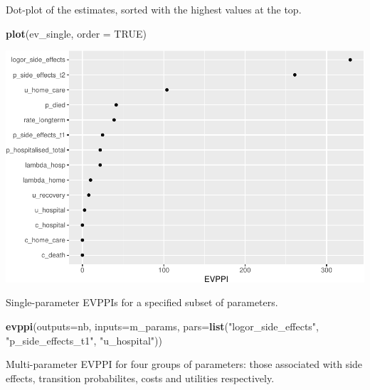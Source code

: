 \documentclass[
]{article}
\newenvironment{Shaded}{\begin{snugshade}}{\end{snugshade}}
\newcommand{\AttributeTok}[1]{\textcolor[rgb]{0.13,0.29,0.53}{#1}}
\newcommand{\ConstantTok}[1]{\textcolor[rgb]{0.56,0.35,0.01}{#1}}
\newcommand{\FunctionTok}[1]{\textcolor[rgb]{0.13,0.29,0.53}{\textbf{#1}}}
\newcommand{\NormalTok}[1]{#1}
\newcommand{\StringTok}[1]{\textcolor[rgb]{0.31,0.60,0.02}{#1}}
\begin{document}
Dot-plot of the estimates, sorted with the highest values at the top.

\begin{Shaded}
\begin{Highlighting}[]
\FunctionTok{plot}\NormalTok{(ev\_single, }\AttributeTok{order =} \ConstantTok{TRUE}\NormalTok{)}
\end{Highlighting}
\end{Shaded}

\includegraphics{evppi_reg_files/figure-latex/dotplot-1.pdf}

Single-parameter EVPPIs for a specified subset of parameters.

\begin{Shaded}
\begin{Highlighting}[]
\FunctionTok{evppi}\NormalTok{(}\AttributeTok{outputs=}\NormalTok{nb, }\AttributeTok{inputs=}\NormalTok{m\_params, }
      \AttributeTok{pars=}\FunctionTok{list}\NormalTok{(}\StringTok{"logor\_side\_effects"}\NormalTok{, }\StringTok{"p\_side\_effects\_t1"}\NormalTok{, }\StringTok{"u\_hospital"}\NormalTok{))}
\end{Highlighting}
\end{Shaded}

Multi-parameter EVPPI for four groups of parameters: those associated
with side effects, transition probabilites, costs and utilities
respectively.
\end{document}
